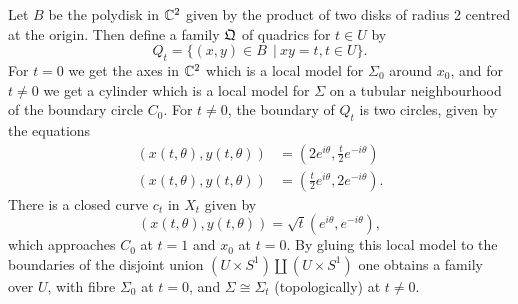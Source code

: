 	Let $B$ be the polydisk in $\mathbb{C}^2$ given by the product of two disks of radius 2 centred at the origin. Then define a family $\mathfrak{Q}$ of quadrics for $t\in U$ by 
	\begin{equation}
		Q_t = \{(x,y)\in B\ ~|~ xy = t, t\in U\}.
	\end{equation}
	For $t=0$ we get the axes in $\mathbb{C}^2$ which is a local model for $\Sigma_0$ around $x_0$, and for $t \neq 0$ we get a cylinder which is a local model for $\Sigma$ on a tubular neighbourhood of the boundary circle $C_0$. For $t\neq 0$, the boundary of $Q_t$ is two circles, given by the equations
	\begin{align*}
		(x(t,\theta), y(t, \theta)) &= \left(
		2e^{i\theta}, \frac{t}{2}e^{-i\theta}
		\right)\\
		(x(t,\theta), y(t, \theta)) &= \left(
		\frac{t}{2}e^{i\theta}, 2e^{-i\theta}
		\right).
	\end{align*}
	There is a closed curve $c_t$ in $X_t$ given by
	\begin{equation}
		(x(t,\theta), y(t,\theta)) = \sqrt{t}(e^{i\theta}, e^{-i\theta}),
	\end{equation}
	which approaches $C_0$ at $t=1$ and $x_0$ at $t=0$. By gluing this local model to the boundaries of the disjoint union $(U\times S^1)\coprod (U\times S^1)$ one obtains a family over $U$, with fibre $\Sigma_0$ at $t=0$, and $\Sigma \cong \Sigma_t$ (topologically) at $t\neq 0$.

